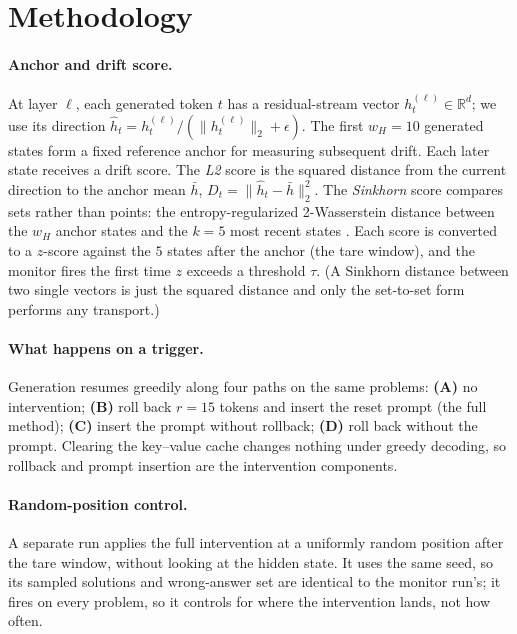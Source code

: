 \documentclass{article}
\begin{document}
\section{Methodology}
\label{sec:method}

\paragraph{Anchor and drift score.}
At layer $\ell$, each generated token $t$ has a residual-stream vector $h_t^{(\ell)}\in\mathbb{R}^d$; we use its direction $\hat h_t = h_t^{(\ell)}/(\lVert h_t^{(\ell)}\rVert_2+\epsilon)$. The first $w_H{=}10$ generated states form a fixed reference anchor for measuring subsequent drift. Each later state receives a drift score. The \emph{L2} score is the squared distance from the current direction to the anchor mean $\bar h$, $D_t = \lVert \hat h_t - \bar h\rVert_2^2$. The \emph{Sinkhorn} score compares sets rather than points: the entropy-regularized 2-Wasserstein distance between the $w_H$ anchor states and the $k{=}5$ most recent states \citep{cuturi2013sinkhorn, feydy2019interpolating}. Each score is converted to a $z$-score against the $5$ states after the anchor (the tare window), and the monitor fires the first time $z$ exceeds a threshold $\tau$. (A Sinkhorn distance between two single vectors is just the squared distance and only the set-to-set form performs any transport.)

\paragraph{What happens on a trigger.}
Generation resumes greedily along four paths on the same problems: \textbf{(A)} no intervention; \textbf{(B)} roll back $r{=}15$ tokens and insert the reset prompt (the full method); \textbf{(C)} insert the prompt without rollback; \textbf{(D)} roll back without the prompt. Clearing the key--value cache changes nothing under greedy decoding, so rollback and prompt insertion are the intervention components.

\paragraph{Random-position control.}
A separate run applies the full intervention at a uniformly random position after the tare window, without looking at the hidden state. It uses the same seed, so its sampled solutions and wrong-answer set are identical to the monitor run's; it fires on every problem, so it controls for where the intervention lands, not how often.
\end{document}
